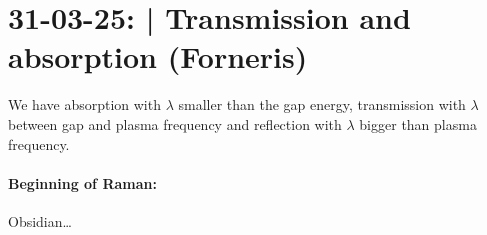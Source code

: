 \section{31-03-25: | Transmission and absorption (Forneris)}

We have absorption with $\lambda$ smaller than the gap energy, transmission with $\lambda$ between gap and plasma frequency and reflection with $\lambda$ bigger than plasma frequency.

\paragraph{Beginning of Raman:} Obsidian\dots